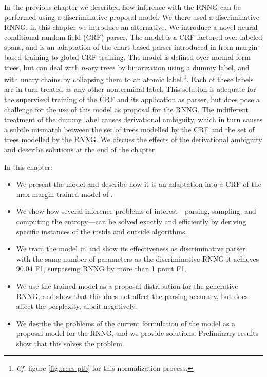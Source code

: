 In the previous chapter we described how inference with the RNNG can be performed using a discriminative proposal model. We there used a discriminative RNNG; in this chapter we introduce an alternative. We introduce a novel neural conditional random field (CRF) parser. The model is a CRF factored over labeled spans, and is an adaptation of the chart-based parser introduced in \citet{stern2017minimal} from margin-based training to global CRF training. The model is defined over normal form trees, but can deal with $n$-ary trees by binarization using a dummy label, and with unary chains by collapsing them to an atomic label.\footnote{\textit{Cf.} figure \ref{fig:trees-ptb} for this normalization process.}. Each of these labels are in turn treated as any other nonterminal label. This solution is adequate for the supervised training of the CRF and its application as parser, but does pose a challenge for the use of this model as proposal for the RNNG. The indifferent treatment of the dummy label causes derivational ambiguity, which in turn causes a subtle mismatch between the set of trees modelled by the CRF and the set of trees modelled by the RNNG. We discuss the effects of the derivational ambiguity and describe solutions at the end of the chapter.

In this chapter:
\begin{itemize}
  \item We present the model and describe how it is an adaptation into a CRF of the max-margin trained model of \citet{stern2017minimal}.
  \item We show how several inference problems of interest---parsing, sampling, and computing the entropy---can be solved exactly and efficiently by deriving specific instances of the inside and outside algorithms.
  \item We train the model in and show its effectiveness as discriminative parser: with the same number of parameters as the discriminative RNNG it achieves 90.04 F1, surpassing RNNG by more than 1 point F1.
  \item We use the trained model as a proposal distribution for the generative RNNG, and show that this does not affect the parsing accuracy, but does affect the perplexity, albeit negatively.
  \item We desribe the problems of the current formulation of the model as a proposal model for the RNNG, and we provide solutions. Preliminary results show that this solves the problem.
\end{itemize}

